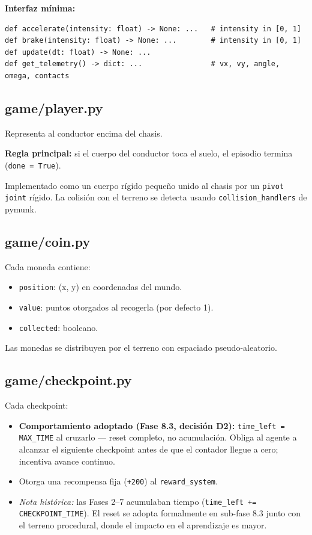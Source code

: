 \documentclass[11pt,a4paper]{article}
\begin{document}
\textbf{Interfaz mínima:}

\begin{lstlisting}
def accelerate(intensity: float) -> None: ...   # intensity in [0, 1]
def brake(intensity: float) -> None: ...        # intensity in [0, 1]
def update(dt: float) -> None: ...
def get_telemetry() -> dict: ...                # vx, vy, angle, omega, contacts
\end{lstlisting}

\subsection{game/player.py}

Representa al conductor encima del chasis.

\textbf{Regla principal:} si el cuerpo del conductor toca el suelo, el episodio termina (\texttt{done = True}).

Implementado como un cuerpo rígido pequeño unido al chasis por un \texttt{pivot joint} rígido. La colisión con el terreno se detecta usando \texttt{collision\_handlers} de pymunk.

\subsection{game/coin.py}

Cada moneda contiene:
\begin{itemize}
    \item \texttt{position}: (x, y) en coordenadas del mundo.
    \item \texttt{value}: puntos otorgados al recogerla (por defecto 1).
    \item \texttt{collected}: booleano.
\end{itemize}

Las monedas se distribuyen por el terreno con espaciado pseudo-aleatorio.

\subsection{game/checkpoint.py}

Cada checkpoint:
\begin{itemize}
    \item \textbf{Comportamiento adoptado (Fase 8.3, decisión D2):}
          \texttt{time\_left = MAX\_TIME} al cruzarlo --- reset completo, no
          acumulación. Obliga al agente a alcanzar el siguiente checkpoint antes
          de que el contador llegue a cero; incentiva avance continuo.
    \item Otorga una recompensa fija (\texttt{+200}) al \texttt{reward\_system}.
    \item \textit{Nota histórica:} las Fases 2--7 acumulaban tiempo
          (\texttt{time\_left += CHECKPOINT\_TIME}). El reset se adopta
          formalmente en sub-fase 8.3 junto con el terreno procedural, donde
          el impacto en el aprendizaje es mayor.
\end{itemize}
\end{document}
